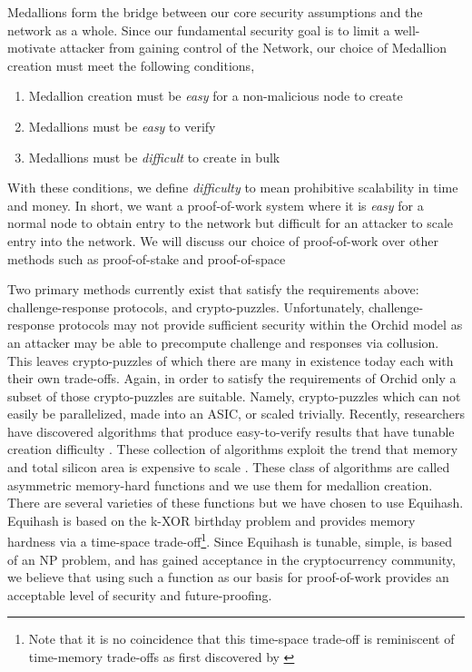 
Medallions form the bridge between our core security assumptions and the network as a whole. Since our fundamental security goal is to limit a well-motivate attacker from gaining control of the \Orchid{} Network, our choice of Medallion creation must meet the following conditions,
  \begin{enumerate}
      \item Medallion creation must be \textit{easy} for a non-malicious node to create
      \item Medallions  must be \textit{easy} to verify
      \item Medallions must be \textit{difficult} to create in bulk
  \end{enumerate}
With these conditions, we define \textit{difficulty} to mean prohibitive scalability in time and money. In short, we want a proof-of-work system where it is \textit{easy} for a normal node to obtain entry to the network but difficult for an attacker to scale entry into the network. We will discuss our choice of proof-of-work over other methods such as proof-of-stake %
and proof-of-space %

Two primary methods currently exist that satisfy the requirements above: challenge-response protocols, and crypto-puzzles. Unfortunately, challenge-response protocols may not provide sufficient security within the Orchid model as an attacker may be able to precompute challenge and responses via collusion. This leaves crypto-puzzles of which there are many in existence today \cite{nakamoto2008bitcoin, Equihash} each with their own trade-offs. Again, in order to satisfy the requirements of Orchid only a subset of those crypto-puzzles are suitable. Namely, crypto-puzzles which can not easily be parallelized, made into an ASIC, or scaled trivially. Recently, researchers have discovered algorithms that produce easy-to-verify results that have tunable creation difficulty \cite{Equihash}. These collection of algorithms exploit the trend that memory and total silicon area is expensive to scale \cite{abadi2005moderately, dwork2005pebbling}. These class of algorithms are called asymmetric memory-hard functions and we use them for medallion creation. There are several varieties of these functions \cite{tromp2014cuckoo, lorimermomentum, Equihash} but we have chosen to use Equihash. Equihash is based on the k-XOR birthday problem and provides memory hardness via a time-space trade-off\footnote{Note that it is no coincidence that this time-space trade-off is reminiscent of time-memory trade-offs as first discovered by \cite{hellman1980cryptanalytic}}. Since Equihash is tunable, simple, is based of an NP problem, and has gained acceptance in the cryptocurrency community, we believe that using such a function as our basis for proof-of-work provides an acceptable level of security and future-proofing.

